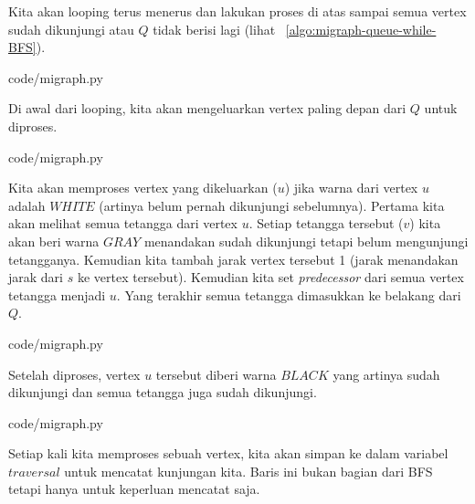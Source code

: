 Kita akan looping terus menerus dan lakukan proses di atas sampai semua vertex sudah dikunjungi atau $Q$ tidak berisi lagi (lihat ~\ref{algo:migraph-queue-while-BFS}).


                {code/migraph.py}
								
Di awal dari looping, kita akan mengeluarkan vertex paling depan dari $Q$ untuk diproses. 


                {code/migraph.py}

Kita akan memproses vertex yang dikeluarkan ($u$) jika warna dari vertex $u$ adalah $WHITE$ (artinya belum pernah dikunjungi sebelumnya). Pertama kita akan melihat semua tetangga dari vertex $u$. Setiap tetangga tersebut ($v$) kita akan beri warna $GRAY$ menandakan sudah dikunjungi tetapi belum mengunjungi tetangganya. Kemudian kita tambah jarak vertex tersebut 1 (jarak menandakan jarak dari $s$ ke vertex tersebut). Kemudian kita set \textit{predecessor} dari semua vertex tetangga menjadi $u$. Yang terakhir semua tetangga dimasukkan ke belakang dari $Q$.


                {code/migraph.py}

Setelah diproses, vertex $u$ tersebut diberi warna $BLACK$ yang artinya sudah dikunjungi dan semua tetangga juga sudah dikunjungi.


                {code/migraph.py}
								
Setiap kali kita memproses sebuah vertex, kita akan simpan ke dalam variabel $traversal$ untuk mencatat kunjungan kita. Baris ini bukan bagian dari BFS tetapi hanya untuk keperluan mencatat saja.

